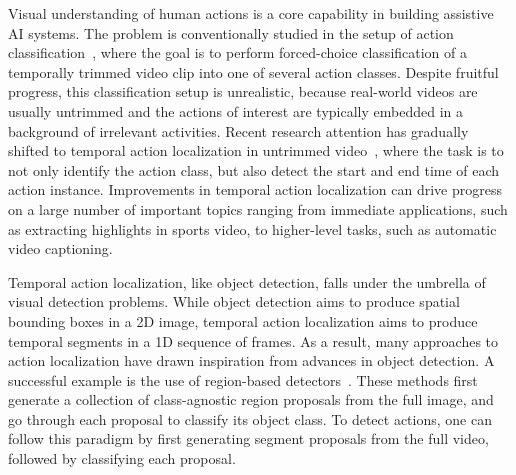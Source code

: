 \documentclass[10pt,twocolumn,letterpaper]{article}
\begin{document}
Visual understanding of human actions is a core capability in building
assistive AI systems. The problem is conventionally studied in the setup of
action classification~\cite{wang:iccv2013,simonyan:nips2014,ng:cvpr2015}, where
the goal is to perform forced-choice classification of a temporally trimmed
video clip into one of several action classes. Despite fruitful progress, this
classification setup is unrealistic, because real-world videos are usually
untrimmed and the actions of interest are typically embedded in a background of
irrelevant activities. Recent research attention has gradually shifted to
temporal action localization in untrimmed
video~\cite{karaman:2014,oneata:2014,wang:2014}, where the task is to not only
identify the action class, but also detect the start and end time of each
action instance. Improvements in temporal action localization can drive
progress on a large number of important topics ranging from immediate
applications, such as extracting highlights in sports video, to higher-level
tasks, such as automatic video captioning.


Temporal action localization, like object detection, falls under the umbrella
of visual detection problems. While object detection aims to produce spatial
bounding boxes in a 2D image, temporal action localization aims to produce
temporal segments in a 1D sequence of frames. As a result, many approaches to
action localization have drawn inspiration from advances in object detection. A
successful example is the use of region-based
detectors~\cite{girshick:cvpr2014,girshick:iccv2015,ren:nips2015}. These
methods first generate a collection of class-agnostic region proposals from the
full image, and go through each proposal to classify its object class. To
detect actions, one can follow this paradigm by first generating segment
proposals from the full video, followed by classifying each proposal.
\end{document}
